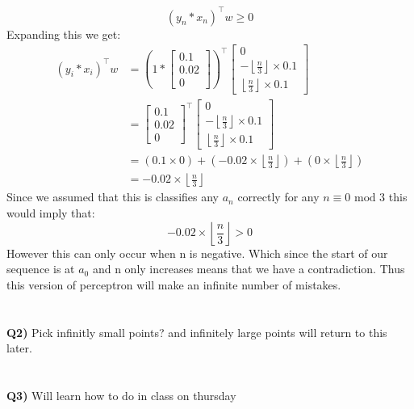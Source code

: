 \documentclass{article}
\begin{document}
\begin{titlepage}
\[ (y_n*x_n)^\top w \geq 0 \]
Expanding this we get:
\begin{align*} 
(y_i*x_i)^\top w &= \left(1*\begin{bmatrix}
0.1\\
0.02\\
0
\end{bmatrix}\right)^\top\begin{bmatrix}
0\\
-\left \lfloor\frac{n}{3}\right \rfloor \times 0.1\\
\left \lfloor\frac{n}{3}\right \rfloor \times 0.1
\end{bmatrix} \\
&=\begin{bmatrix}
0.1\\
0.02\\
0
\end{bmatrix}^\top\begin{bmatrix}
0\\
-\left \lfloor\frac{n}{3}\right \rfloor \times 0.1\\
\left \lfloor\frac{n}{3}\right \rfloor \times 0.1
\end{bmatrix}\\
&= (0.1\times0) + (-0.02 \times \left \lfloor\frac{n}{3}\right \rfloor) + (0 \times \left \lfloor\frac{n}{3}\right \rfloor) \\
&= -0.02 \times \left \lfloor\frac{n}{3}\right \rfloor
\end{align*}
Since we assumed that this is classifies any $a_n$ correctly for any $n \equiv 0\text{  mod 3}$ this would imply that:
\[ -0.02 \times \left \lfloor\frac{n}{3}\right \rfloor > 0 \]
However this can only occur when n is negative. Which since the start of our sequence is at $a_0$ and n only increases means that we have a contradiction. Thus this version of perceptron will make an infinite number of mistakes. \\\\\\
\textbf{Q2)} Pick infinitly small points? and infinitely large points will return to this later.  \\\\\\
\textbf{Q3)} Will learn how to do in class on thursday
\end{titlepage}
\end{document}
